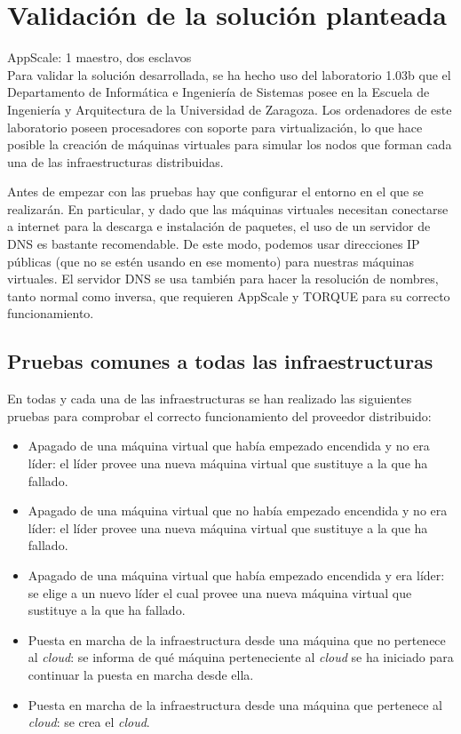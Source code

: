 \chapter{Validación de la solución planteada}
\label{cap:validacion}


AppScale: 1 maestro, dos esclavos\\


Para validar la solución desarrollada, se ha hecho uso del laboratorio 1.03b que el Departamento de Informática e Ingeniería de Sistemas posee en la Escuela de Ingeniería y Arquitectura de la Universidad de Zaragoza. Los ordenadores de este laboratorio poseen procesadores con soporte para virtualización, lo que hace posible la creación de máquinas virtuales para simular los nodos que forman cada una de las infraestructuras distribuidas.

Antes de empezar con las pruebas hay que configurar el entorno en el que se realizarán. En particular, y dado que las máquinas virtuales necesitan conectarse a internet para la descarga e instalación de paquetes, el uso de un servidor de DNS es bastante recomendable. De este modo, podemos usar direcciones IP públicas (que no se estén usando en ese momento) para nuestras máquinas virtuales. El servidor DNS se usa también para hacer la resolución de nombres, tanto normal como inversa, que requieren AppScale y TORQUE para su correcto funcionamiento.


\section{Pruebas comunes a todas las infraestructuras}

En todas y cada una de las infraestructuras se han realizado las siguientes pruebas para comprobar el correcto funcionamiento del proveedor distribuido:

\begin{itemize}
\item Apagado de una máquina virtual que había empezado encendida y no era líder: el líder provee una nueva máquina virtual que sustituye a la que ha fallado.
\item Apagado de una máquina virtual que no había empezado encendida y no era líder: el líder provee una nueva máquina virtual que sustituye a la que ha fallado.
\item Apagado de una máquina virtual que había empezado encendida y era líder: se elige a un nuevo líder el cual provee una nueva máquina virtual que sustituye a la que ha fallado.
\item Puesta en marcha de la infraestructura desde una máquina que no pertenece al \emph{cloud}: se informa de qué máquina perteneciente al \emph{cloud} se ha iniciado para continuar la puesta en marcha desde ella.
\item Puesta en marcha de la infraestructura desde una máquina que pertenece al \emph{cloud}: se crea el \emph{cloud}.
\end{itemize}

